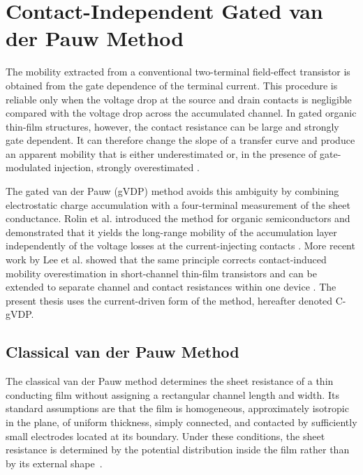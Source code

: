 \section{Contact-Independent Gated van der Pauw Method}
\label{sec:gated_van_der_pauw_method}

The mobility extracted from a conventional two-terminal field-effect
transistor is obtained from the gate dependence of the terminal current. This
procedure is reliable only when the voltage drop at the source and drain
contacts is negligible compared with the voltage drop across the accumulated
channel. In gated organic thin-film structures, however, the contact
resistance can be large and strongly gate dependent. It can therefore change the slope of a
transfer curve and produce an apparent mobility that is either underestimated
or, in the presence of gate-modulated injection, strongly overestimated
\cite{Bittle2016MobilityOverestimation,Natali2012ChargeInjection}.

The gated van der Pauw (gVDP) method avoids this ambiguity by combining
electrostatic charge accumulation with a four-terminal measurement of the
sheet conductance. Rolin et al. introduced the method for organic
semiconductors and demonstrated that it yields the long-range mobility of the
accumulation layer independently of the voltage losses at the current-injecting
contacts \cite{Rolin2017GVDP}. More recent work by Lee et al. showed that the
same principle corrects contact-induced mobility overestimation in short-channel
thin-film transistors and can be extended to separate channel and contact
resistances within one device \cite{Lee2024GVDPIGZO,Lee2025VoltageDrivenGVDP}.
The present thesis uses the current-driven form of the method, hereafter
denoted C-gVDP.

\subsection{Classical van der Pauw Method}

The classical van der Pauw method determines the sheet resistance of a thin
conducting film without assigning a rectangular channel length and width. Its
standard assumptions are that the film is homogeneous, approximately isotropic
in the plane, of uniform thickness, simply connected, and contacted by
sufficiently small electrodes located at its boundary. Under these conditions,
the sheet resistance is determined by the potential distribution inside the
film rather than by its external shape~\cite{VanDerPauw1958}.

